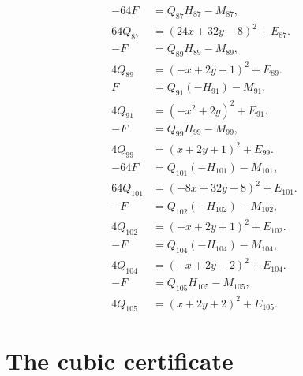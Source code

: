 \documentclass[11pt]{article}
\begin{document}
\begin{align}
-64F&=Q_{87}H_{87}-M_{87},\label{eq:sign87}\\
64Q_{87}&=(24x+32y-8)^2+E_{87}.\label{eq:sign87b}\\
-F&=Q_{89}H_{89}-M_{89},\label{eq:sign89}\\
4Q_{89}&=(-x+2y-1)^2+E_{89}.\label{eq:sign89b}\\
F&=Q_{91}(-H_{91})-M_{91},\label{eq:sign91}\\
4Q_{91}&=(-x^{2}+2y)^2+E_{91}.\label{eq:sign91b}\\
-F&=Q_{99}H_{99}-M_{99},\label{eq:sign99}\\
4Q_{99}&=(x+2y+1)^2+E_{99}.\label{eq:sign99b}\\
-64F&=Q_{101}(-H_{101})-M_{101},\label{eq:sign101}\\
64Q_{101}&=(-8x+32y+8)^2+E_{101}.\label{eq:sign101b}\\
-F&=Q_{102}(-H_{102})-M_{102},\label{eq:sign102}\\
4Q_{102}&=(-x+2y+1)^2+E_{102}.\label{eq:sign102b}\\
-F&=Q_{104}(-H_{104})-M_{104},\label{eq:sign104}\\
4Q_{104}&=(-x+2y-2)^2+E_{104}.\label{eq:sign104b}\\
-F&=Q_{105}H_{105}-M_{105},\label{eq:sign105}\\
4Q_{105}&=(x+2y+2)^2+E_{105}.\label{eq:sign105b}
\end{align}

\section{The cubic certificate}
\end{document}
